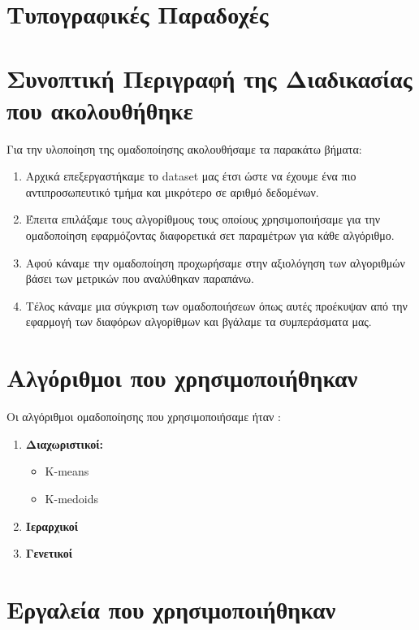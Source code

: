 \section{Τυπογραφικές Παραδοχές}

\section{Συνοπτική Περιγραφή της Διαδικασίας που ακολουθήθηκε}
Για την υλοποίηση της ομαδοποίησης ακολουθήσαμε τα παρακάτω βήματα:
\begin{enumerate}
	\item Αρχικά επεξεργαστήκαμε το dataset μας έτσι ώστε να έχουμε ένα πιο αντιπροσωπευτικό τμήμα και μικρότερο σε αριθμό δεδομένων. 
	\item Έπειτα επιλάξαμε τους αλγορίθμους τους οποίους χρησιμοποιήσαμε για την ομαδοποίηση εφαρμόζοντας διαφορετικά σετ παραμέτρων για κάθε αλγόριθμο.
	\item Αφού κάναμε την ομαδοποίηση προχωρήσαμε στην αξιολόγηση των αλγοριθμών βάσει των μετρικών που αναλύθηκαν παραπάνω.
	\item Τέλος κάναμε μια σύγκριση των ομαδοποιήσεων όπως αυτές προέκυψαν από την εφαρμογή των διαφόρων αλγορίθμων και βγάλαμε τα συμπεράσματα μας.
\end{enumerate}

\section{Αλγόριθμοι που χρησιμοποιήθηκαν}
Οι αλγόριθμοι ομαδοποίησης που χρησιμοποιήσαμε ήταν :

\begin{enumerate}
	\item \textbf{Διαχωριστικοί:}
	\begin{itemize}
		\item K-means
		\item K-medoids
	\end{itemize}  
	\item \textbf{Ιεραρχικοί}

	\item \textbf{Γενετικοί}  

\end{enumerate}

\section{Εργαλεία που χρησιμοποιήθηκαν}

